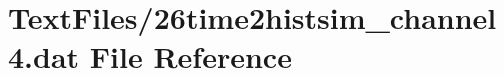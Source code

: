 \hypertarget{26time2histsim__channel4_8dat}{}\section{Text\+Files/26time2histsim\+\_\+channel4.dat File Reference}
\label{26time2histsim__channel4_8dat}
